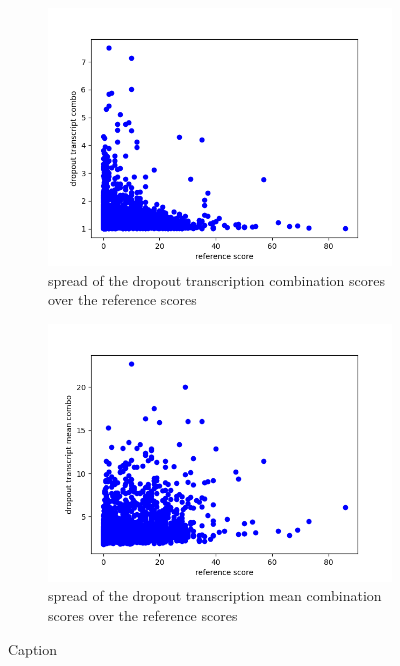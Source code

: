 \begin{figure}
\begin{subfigure}{0.4\linewidth}
        \includegraphics[width=\textwidth]{Latex/sections/images/seamlessdropouttranscriptcombo.png}
        \caption{spread of the dropout transcription combination scores over the reference scores}
    \end{subfigure}
    \begin{subfigure}{0.4\linewidth}
        \includegraphics[width=\textwidth]{Latex/sections/images/seamlessdropouttranscriptmeancombo.png}
        \caption{spread of the dropout transcription mean combination scores over the reference scores}
    \end{subfigure}
    \caption{Caption}
    \label{fig:dropout transcript scores}
\end{figure}

